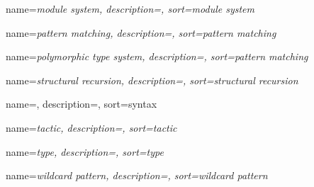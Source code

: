 {
  name=\sl{module system},
  description={},
  sort={module system}
}

{
  name=\sl{pattern matching},
  description={},
  sort={pattern matching}
}

{
  name=\sl{polymorphic type system},
  description={},
  sort={pattern matching}
}

{
  name=\sl{structural recursion},
  description={},
  sort={structural recursion}
}

{
  name=,
  description={},
  sort={syntax}
}

{
  name=\sl{tactic},
  description={},
  sort={tactic}
}

{
  name=\sl{type},
  description={},
  sort={type}
}

{
  name=\sl{wildcard pattern},
  description={},
  sort={wildcard pattern}
}
